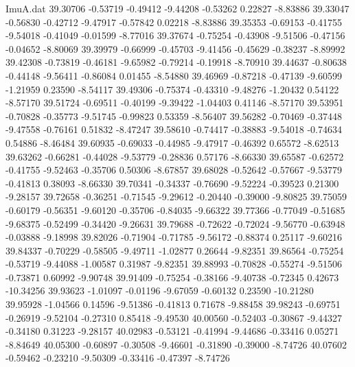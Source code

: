 \begin{filecontents}{ImuA.dat}
  39.30706   -0.53719   -0.49412   -9.44208   -0.53262    0.22827   -8.83886
  39.33047   -0.56830   -0.42712   -9.47917   -0.57842    0.02218   -8.83886
  39.35353   -0.69153   -0.41755   -9.54018   -0.41049   -0.01599   -8.77016
  39.37674   -0.75254   -0.43908   -9.51506   -0.47156   -0.04652   -8.80069
  39.39979   -0.66999   -0.45703   -9.41456   -0.45629   -0.38237   -8.89992
  39.42308   -0.73819   -0.46181   -9.65982   -0.79214   -0.19918   -8.70910
  39.44637   -0.80638   -0.44148   -9.56411   -0.86084    0.01455   -8.54880
  39.46969   -0.87218   -0.47139   -9.60599   -1.21959    0.23590   -8.54117
  39.49306   -0.75374   -0.43310   -9.48276   -1.20432    0.54122   -8.57170
  39.51724   -0.69511   -0.40199   -9.39422   -1.04403    0.41146   -8.57170
  39.53951   -0.70828   -0.35773   -9.51745   -0.99823    0.53359   -8.56407
  39.56282   -0.70469   -0.37448   -9.47558   -0.76161    0.51832   -8.47247
  39.58610   -0.74417   -0.38883   -9.54018   -0.74634    0.54886   -8.46484
  39.60935   -0.69033   -0.44985   -9.47917   -0.46392    0.65572   -8.62513
  39.63262   -0.66281   -0.44028   -9.53779   -0.28836    0.57176   -8.66330
  39.65587   -0.62572   -0.41755   -9.52463   -0.35706    0.50306   -8.67857
  39.68028   -0.52642   -0.57667   -9.53779   -0.41813    0.38093   -8.66330
  39.70341   -0.34337   -0.76690   -9.52224   -0.39523    0.21300   -9.28157
  39.72658   -0.36251   -0.71545   -9.29612   -0.20440   -0.39000   -9.80825
  39.75059   -0.60179   -0.56351   -9.60120   -0.35706   -0.84035   -9.66322
  39.77366   -0.77049   -0.51685   -9.68375   -0.52499   -0.34420   -9.26631
  39.79688   -0.72622   -0.72024   -9.56770   -0.63948   -0.03888   -9.18998
  39.82026   -0.71904   -0.71785   -9.56172   -0.88374    0.25117   -9.60216
  39.84337   -0.70229   -0.58505   -9.49711   -1.02877    0.26644   -9.82351
  39.86564   -0.75254   -0.53719   -9.44088   -1.00587    0.31987   -9.82351
  39.88993   -0.70828   -0.55274   -9.51506   -0.73871    0.60992   -9.90748
  39.91409   -0.75254   -0.38166   -9.40738   -0.72345    0.42673  -10.34256
  39.93623   -1.01097   -0.01196   -9.67059   -0.60132    0.23590  -10.21280
  39.95928   -1.04566    0.14596   -9.51386   -0.41813    0.71678   -9.88458
  39.98243   -0.69751   -0.26919   -9.52104   -0.27310    0.85418   -9.49530
  40.00560   -0.52403   -0.30867   -9.44327   -0.34180    0.31223   -9.28157
  40.02983   -0.53121   -0.41994   -9.44686   -0.33416    0.05271   -8.84649
  40.05300   -0.60897   -0.30508   -9.46601   -0.31890   -0.39000   -8.74726
  40.07602   -0.59462   -0.23210   -9.50309   -0.33416   -0.47397   -8.74726

\end{filecontents}
